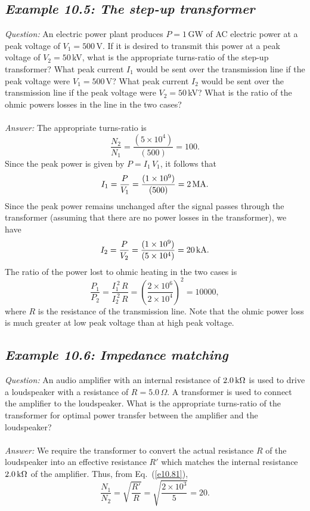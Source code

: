 \subsection*{\em Example 10.5: The step-up transformer}
{\em Question:} An electric power plant produces $P=1$\,GW of AC
electric power at a peak voltage of $V_1=500$\,V. If it is desired to
transmit this power at a peak voltage of $V_2= 50$\,kV,
what is the appropriate turns-ratio of the step-up transformer? 
What peak current $I_1$ would be sent over the transmission line if the peak
voltage were $V_1=500$\,V? What peak current $I_2$ would be sent over the transmission
 line if the peak
voltage were $V_2=50$\,kV? What is the ratio of the ohmic powers losses in
the line in the two cases?\\
~\\
{\em Answer:} The appropriate turns-ratio
is
$$
\frac{N_2}{N_1} = \frac{(5\times 10^4)}{(500)} = 100.
$$
Since the peak power is given by $P=I_1\,V_1$, it follows that
$$
I_1 = \frac{P}{V_1} = \frac{(1\times 10^9)}{(500)} = 2\,{\rm MA}.
$$
Since the peak power remains unchanged after the signal
passes through the transformer (assuming that there are no
power losses in the transformer), we have
$$
I_2 = \frac{P}{V_2} = \frac{(1\times 10^9)}{(5\times 10^4)} = 20\,{\rm kA}.
$$
The ratio of the power lost to ohmic heating in the two
cases is
$$
\frac{P_1}{P_2} = \frac{I_1^{~2}\,R}{I_2^{~2}\,R} = \left(\frac{2\times 10^6}
{2\times 10^4}\right)^2 = 10000,
$$
where $R$ is the resistance of the transmission line. Note that the ohmic
power loss is much greater at low peak voltage than at high peak voltage. 


\subsection*{\em Example 10.6: Impedance matching}
{\em Question:} An audio amplifier with an internal
resistance of $2.0\,{\rm k}\Omega$ is used to drive
a loudspeaker with a resistance of $R=5.0\,\Omega$. A transformer is
used to connect the amplifier to the loudspeaker. What is the
appropriate turns-ratio of the transformer for optimal power transfer
between the amplifier and the loudspeaker?\\
~\\
{\em Answer:} We require the transformer to convert the actual resistance $R$ of
the loudspeaker into an effective resistance $R'$ which matches 
the internal resistance $2.0\,{\rm k}\Omega$ of the amplifier. Thus,
from  Eq.~(\ref{e10.81}),
$$
\frac{N_1}{N_2} = \sqrt{\frac{R'}{R} } = \sqrt{\frac{2\times 10^3}{5}}
= 20.
$$


